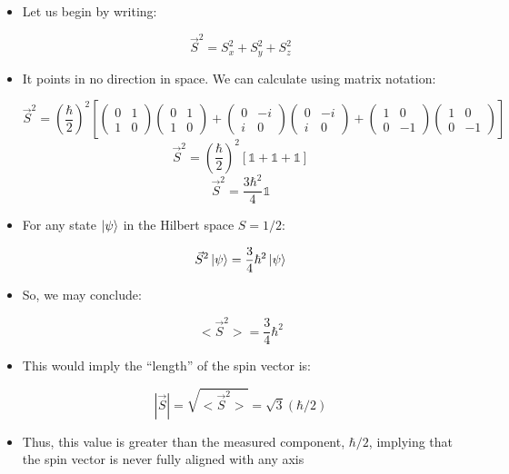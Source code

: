 \begin{itemize}
    \begin{itemize}

      \item Let us begin by writing:

        $$\vec{S}^2=S_x^2+S_y^2+S_z^2$$

      \item It points in no direction in space. We can calculate using matrix notation:

        $$\vec{S}^2=\left( \frac{\hbar}{2} \right)^2\left[\left( \begin{matrix} 0 & 1\\1 & 0\end{matrix} \right)\left( \begin{matrix} 0 & 1\\1 & 0\end{matrix} \right)+\left( \begin{matrix} 0 & -i\\i & 0\end{matrix} \right)\left( \begin{matrix} 0 & -i\\i & 0\end{matrix} \right)+\left( \begin{matrix} 1 & 0\\0 & -1\end{matrix} \right)\left( \begin{matrix} 1 & 0\\0 & -1\end{matrix} \right)\right]$$
        $$\vec{S}^2=\left( \frac{\hbar}{2} \right)^2\left[ \mathbb{1}+\mathbb{1}+\mathbb{1} \right]$$
        $$\vec{S}^2=\frac{3\hbar^2}{4}\mathbb{1}$$

      \item For any state $\ket{\psi}$ in the Hilbert space $S=1/2$:

        $$\vec{S}^2\ket{\psi}=\frac{3}{4}\hbar^2\ket{\psi}$$

      \item So, we may conclude:

        $$<\vec{S}^2>=\frac{3}{4}\hbar^2$$

      \item This would imply the ``length'' of the spin vector is:

        $$|\vec{S}|=\sqrt{<\vec{S}^2>}=\sqrt{3}(\hbar/2)$$

      \item Thus, this value is greater than the measured component, $\hbar/2$, implying that the spin vector is never fully aligned with any axis


\end{itemize}
\end{itemize}
